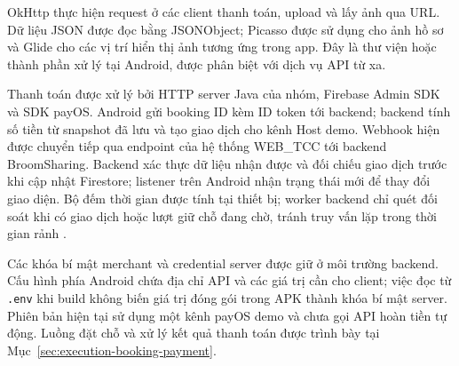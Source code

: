 OkHttp thực hiện request ở các client thanh toán, upload và lấy ảnh qua URL. Dữ liệu JSON được đọc bằng JSONObject; Picasso được sử dụng cho ảnh hồ sơ và Glide cho các vị trí hiển thị ảnh tương ứng trong app. Đây là thư viện hoặc thành phần xử lý tại Android, được phân biệt với dịch vụ API từ xa.

Thanh toán được xử lý bởi HTTP server Java của nhóm, Firebase Admin SDK và SDK payOS. Android gửi booking ID kèm ID token tới backend; backend tính số tiền từ snapshot đã lưu và tạo giao dịch cho kênh Host demo. Webhook hiện được chuyển tiếp qua endpoint của hệ thống WEB\_TCC tới backend BroomSharing. Backend xác thực dữ liệu nhận được và đối chiếu giao dịch trước khi cập nhật Firestore; listener trên Android nhận trạng thái mới để thay đổi giao diện. Bộ đếm thời gian được tính tại thiết bị; worker backend chỉ quét đối soát khi có giao dịch hoặc lượt giữ chỗ đang chờ, tránh truy vấn lặp trong thời gian rảnh \parencite{payos_java,payos_webhook,firebase_listeners}.

Các khóa bí mật merchant và credential server được giữ ở môi trường backend. Cấu hình phía Android chứa địa chỉ API và các giá trị cần cho client; việc đọc từ \texttt{.env} khi build không biến giá trị đóng gói trong APK thành khóa bí mật server. Phiên bản hiện tại sử dụng một kênh payOS demo và chưa gọi API hoàn tiền tự động. Luồng đặt chỗ và xử lý kết quả thanh toán được trình bày tại Mục~\ref{sec:execution-booking-payment}.

